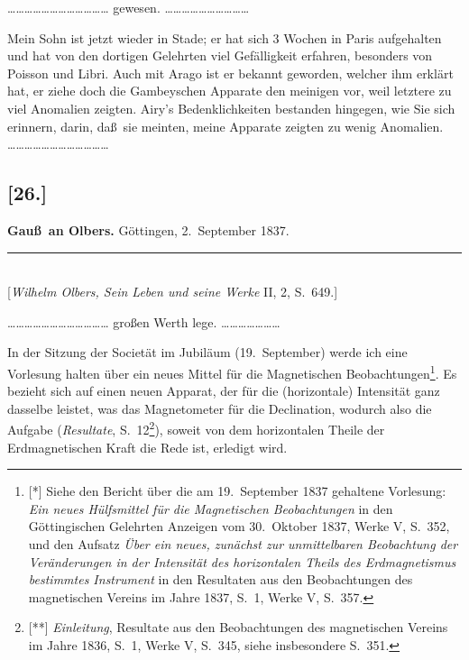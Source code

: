 \documentclass[12pt,a4paper]{article}
\theoremstyle{plain}
\theoremstyle{definition}
\theoremstyle{remark}
\begin{document}
\smallskip
\ldots\ldots\ldots\ldots\ldots\ldots\ldots\ldots\ldots\ldots\ldots\ldots
gewesen. \ldots\ldots\ldots\ldots\ldots\ldots\ldots\ldots\ldots\ldots

Mein Sohn ist jetzt wieder in Stade; er hat sich 3 Wochen in Paris
aufgehalten und hat von den dortigen Gelehrten viel Gef\"alligkeit
erfahren, besonders von {\sc Poisson} und {\sc Libri}. Auch mit
{\sc Arago} ist er bekannt geworden, welcher ihm erkl\"art hat, er
ziehe doch die {\sc Gambey}schen Apparate den meinigen vor, weil
letztere zu viel Anomalien zeigten. {\sc Airy}'s Bedenklichkeiten
bestanden hingegen, wie Sie sich erinnern, darin, da\ss\ sie meinten,
meine Apparate zeigten zu wenig Anomalien.
\ldots\ldots\ldots\ldots\ldots\ldots\ldots\ldots\ldots\ldots\ldots\ldots

\subsection*{[26.]}
\begin{center}
\textbf{Gau\ss\ an Olbers.} G\"ottingen, 2.~September 1837.
\end{center}
\begin{center}
\rule{6cm}{0.4pt}\\[4pt]
[{\it Wilhelm Olbers, Sein Leben und seine Werke} II, 2, S.~649.]
\end{center}

\smallskip
\ldots\ldots\ldots\ldots\ldots\ldots\ldots\ldots\ldots\ldots\ldots\ldots
gro\ss en Werth lege. \ldots\ldots\ldots\ldots\ldots\ldots\ldots

In der Sitzung der Societ\"at im Jubil\"aum (19.~September) werde ich
eine Vorlesung halten \"uber ein neues Mittel f\"ur die Magnetischen
Beobachtungen\footnote{[*] Siehe den Bericht \"uber die am 19.~September 1837 gehaltene
Vorlesung: {\it Ein neues H\"ulfsmittel f\"ur die Magnetischen
Beobachtungen} in den G\"ottingischen Gelehrten Anzeigen vom
30.~Oktober 1837, Werke V, S.~352, und den Aufsatz {\it \"Uber ein
neues, zun\"achst zur unmittelbaren Beobachtung der Ver\"anderungen
in der Intensit\"at des horizontalen Theils des Erdmagnetismus
bestimmtes Instrument} in den Resultaten aus den Beobachtungen des
magnetischen Vereins im Jahre 1837, S.~1, Werke V, S.~357.}. Es
bezieht sich auf einen neuen Apparat, der f\"ur die (horizontale)
Intensit\"at ganz dasselbe leistet, was das Magnetometer f\"ur die
Declination, wodurch also die Aufgabe ({\it Resultate}, S.~12\footnote{[**]
{\it Einleitung}, Resultate aus den Beobachtungen des magnetischen Vereins
im Jahre 1836, S.~1, Werke V, S.~345, siehe insbesondere S.~351.}),
soweit von dem horizontalen Theile der Erdmagnetischen Kraft die
Rede ist, erledigt wird.
\end{document}
